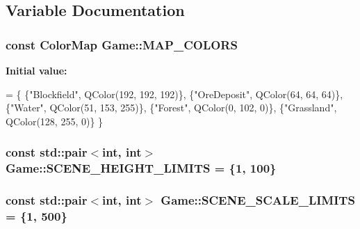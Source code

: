 \subsection{Variable Documentation}
\hypertarget{namespaceGame_aaa1d872d39beea46fb7e5466a65838c0}{
\subsubsection[{M\-A\-P\-\_\-\-C\-O\-L\-O\-R\-S}]{\setlength{\rightskip}{0pt plus 5cm}const {\bf Color\-Map} Game\-::\-M\-A\-P\-\_\-\-C\-O\-L\-O\-R\-S}}\label{namespaceGame_aaa1d872d39beea46fb7e5466a65838c0}
{\bfseries Initial value\-:}
\begin{DoxyCode}
= \{
    \{\textcolor{stringliteral}{"Blockfield"}, QColor(192, 192, 192)\},
    \{\textcolor{stringliteral}{"OreDeposit"}, QColor(64, 64, 64)\},
    \{\textcolor{stringliteral}{"Water"}, QColor(51, 153, 255)\},
    \{\textcolor{stringliteral}{"Forest"}, QColor(0, 102, 0)\},
    \{\textcolor{stringliteral}{"Grassland"}, QColor(128, 255, 0)\}
\}
\end{DoxyCode}
\hypertarget{namespaceGame_a6e134f98c66ebe13d5b90edfcde55739}{
\subsubsection[{S\-C\-E\-N\-E\-\_\-\-H\-E\-I\-G\-H\-T\-\_\-\-L\-I\-M\-I\-T\-S}]{\setlength{\rightskip}{0pt plus 5cm}const std\-::pair$<$int, int$>$ Game\-::\-S\-C\-E\-N\-E\-\_\-\-H\-E\-I\-G\-H\-T\-\_\-\-L\-I\-M\-I\-T\-S = \{1, 100\}}}\label{namespaceGame_a6e134f98c66ebe13d5b90edfcde55739}
\hypertarget{namespaceGame_abe5aac346864cae6fd721ae3467920c4}{
\subsubsection[{S\-C\-E\-N\-E\-\_\-\-S\-C\-A\-L\-E\-\_\-\-L\-I\-M\-I\-T\-S}]{\setlength{\rightskip}{0pt plus 5cm}const std\-::pair$<$int, int$>$ Game\-::\-S\-C\-E\-N\-E\-\_\-\-S\-C\-A\-L\-E\-\_\-\-L\-I\-M\-I\-T\-S = \{1, 500\}}}\label{namespaceGame_abe5aac346864cae6fd721ae3467920c4}
